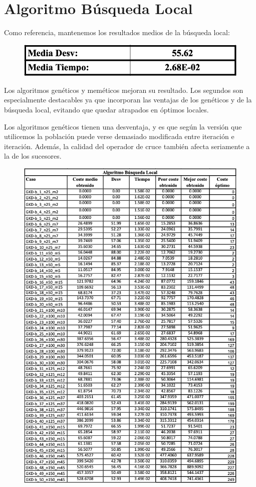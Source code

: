 \newpage

\section{Algoritmo Búsqueda Local}
Como referencia, mantenemos los resultados medios de la búsqueda local:
\begin{figure}[H] %
    \centering
        \includegraphics[scale=0.35]{img/bl2.png}
\end{figure}

Los algoritmos genéticos y meméticos mejoran su resultado. Los segundos son especialmente destacables ya que incorporan las ventajas de los genéticos y de la búsqueda local, evitando que quedar atrapados en óptimos locales.

Los algoritmos genéticos tienen una desventaja, y es que según la versión que utilicemos la población puede verse demasiado modificada entre iteración e iteración. Además, la calidad del operador de cruce también afecta seriamente a la de los sucesores.

\begin{figure}[H] %
    \centering
        \includegraphics[scale=0.65]{img/bl.png}
\end{figure}




